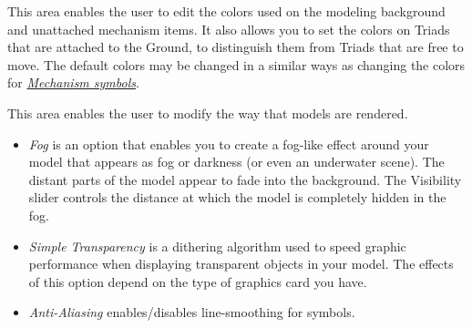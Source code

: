 
This area enables the user to edit the colors used on the modeling background
and unattached mechanism items. It also allows you to set the colors on Triads
that are attached to the Ground, to distinguish them from Triads that are free
to move. The default colors may be changed in a similar ways as changing the
colors for \protect\hyperlink{mechanism-symbols}{\sl Mechanism symbols}.


This area enables the user to modify the way that models are rendered.

\begin{itemize}
\item{\sl Fog} is an option that enables you to create a fog-like effect around
  your model that appears as fog or darkness (or even an underwater scene).
  The distant parts of the model appear to fade into the background.
  The Visibility slider controls the distance at which the model is completely
  hidden in the fog.
 \item{\sl Simple Transparency} is a dithering algorithm used to speed graphic
   performance when displaying transparent objects in your model.
   The effects of this option depend on the type of graphics card you have.
 \item{\sl Anti-Aliasing} enables/disables line-smoothing for symbols.
\end{itemize}





